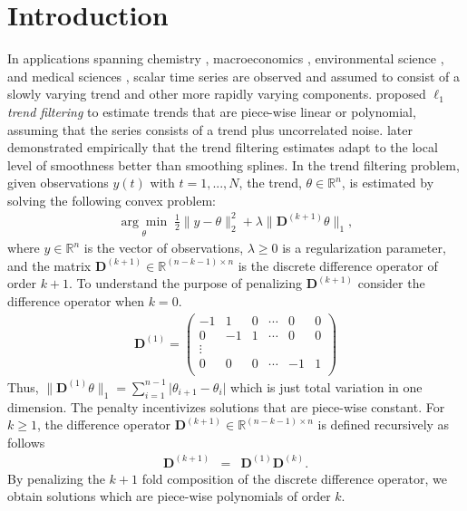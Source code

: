 \documentclass[12pt]{article}
\begin{document}
	\newpage
	\section{Introduction}
	\label{sec:intro}
	
	In applications spanning chemistry \citep{Ning2014}, macroeconomics \citep{yamada2017estimating}, environmental science \citep{brantley2014mobile}, and medical sciences \citep{pettersson2013algorithm, marandi2015qualitative}, scalar time series are observed and assumed to consist of a slowly varying trend and other more rapidly varying components. \cite{Kim2009} proposed \textit{$\ell_1$ trend filtering} to estimate trends that are piece-wise linear or polynomial, assuming that the series consists of a trend plus uncorrelated noise. \cite{Tib2014} later demonstrated empirically that the trend filtering estimates adapt to the local level of smoothness better than smoothing splines. In the trend filtering problem, given observations $y(t)$ with $t=1,...,N$, the trend, $\theta \in \mathbb{R}^n$, is estimated by solving the following convex problem:
	\begin{eqnarray}
	\underset{\theta}{\arg\min}\; \frac{1}{2} \lVert y - \theta \rVert_2^2 + \lambda \lVert \mathbf{D}^{(k+1)}\theta \rVert_1,
	\end{eqnarray}
	where $y \in \mathbb{R}^n$ is the vector of observations, $\lambda \geq 0$ is a regularization parameter, and the matrix $\mathbf{D}^{(k+1)} \in \mathbb{R}^{(n - k -1) \times n}$ is the discrete difference operator of order $k+1$. To understand the purpose of penalizing $\mathbf{D}^{(k+1)}$ consider the difference operator when $k = 0$.
	\begin{eqnarray}
	\mathbf{D}^{(1)} = \begin{pmatrix}
	-1 & 1 & 0 & \cdots & 0 & 0 \\
	0 & -1 & 1 & \cdots & 0 & 0 \\
	\vdots & & & & & \\
	0 & 0 & 0 & \cdots & -1 & 1 \\
	\end{pmatrix}
	\end{eqnarray}
	Thus, $\lVert \mathbf{D}^{(1)}\theta \rVert_1 = \sum_{i=1}^{n-1} \lvert \theta_{i+1} - \theta_{i} \rvert$ which is just total variation in one dimension. The penalty incentivizes solutions that are piece-wise constant. For $k \geq 1$, the difference operator $\mathbf{D}^{(k+1)} \in \mathbb{R}^{(n-k-1) \times n}$ is defined recursively as follows
	\begin{eqnarray}
	\mathbf{D}^{(k+1)} & = & \mathbf{D}^{(1)}\mathbf{D}^{(k)}.
	\end{eqnarray}
	By penalizing the $k+1$ fold composition of the discrete difference operator, we obtain solutions which are piece-wise polynomials of order $k$. 
	
\end{document}
